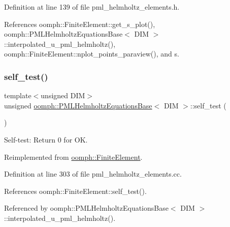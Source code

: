 Definition at line 139 of file pml\+\_\+helmholtz\+\_\+elements.\+h.



References oomph\+::\+Finite\+Element\+::get\+\_\+s\+\_\+plot(), oomph\+::\+P\+M\+L\+Helmholtz\+Equations\+Base$<$ D\+I\+M $>$\+::interpolated\+\_\+u\+\_\+pml\+\_\+helmholtz(), oomph\+::\+Finite\+Element\+::nplot\+\_\+points\+\_\+paraview(), and s.

\mbox{\label{classoomph_1_1PMLHelmholtzEquationsBase_a92b8b911dde0f9ece84d1b06a7b93936}} 
\subsubsection{\texorpdfstring{self\+\_\+test()}{self\_test()}}
{\footnotesize\ttfamily template$<$unsigned D\+IM$>$ \\
unsigned \hyperlink{classoomph_1_1PMLHelmholtzEquationsBase}{oomph\+::\+P\+M\+L\+Helmholtz\+Equations\+Base}$<$ D\+IM $>$\+::self\+\_\+test (\begin{DoxyParamCaption}{ }\end{DoxyParamCaption})\hspace{0.3cm}{\ttfamily [virtual]}}



Self-\/test\+: Return 0 for OK. 



Reimplemented from \hyperlink{classoomph_1_1FiniteElement_af94c5a5e22175d5420b33b3b79e46ed3}{oomph\+::\+Finite\+Element}.



Definition at line 303 of file pml\+\_\+helmholtz\+\_\+elements.\+cc.



References oomph\+::\+Finite\+Element\+::self\+\_\+test().



Referenced by oomph\+::\+P\+M\+L\+Helmholtz\+Equations\+Base$<$ D\+I\+M $>$\+::interpolated\+\_\+u\+\_\+pml\+\_\+helmholtz().

\mbox{\label{classoomph_1_1PMLHelmholtzEquationsBase_afc6e1b81652e12e1dcb7685baa02fce8}} 
